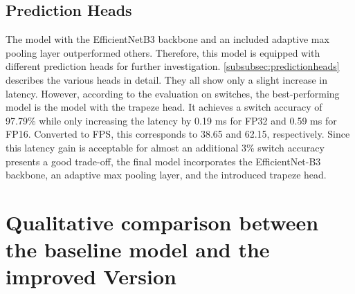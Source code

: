\subsection{Prediction Heads}

\begin{table}[H]
    \centering
    \caption{Prediction Heads Results}
    \label{tab:predHeadsResults}
\end{table}

The model with the EfficientNetB3 backbone and an included adaptive max pooling layer outperformed others.
Therefore, this model is equipped with different prediction heads for further investigation.
\autoref{subsubsec:predictionheads} describes the various heads in detail.
They all show only a slight increase in latency.
However, according to the evaluation on switches, the best-performing model is the model with the trapeze head.
It achieves a switch accuracy of 97.79\% while only increasing the latency by 0.19 ms for FP32 and 0.59 ms for FP16.
Converted to \ac{FPS}, this corresponds to 38.65 and 62.15, respectively.
Since this latency gain is acceptable for almost an additional 3\% switch accuracy presents a good trade-off, the final model incorporates the EfficientNet-B3 backbone, an adaptive max pooling layer, and the introduced trapeze head.

\section{Qualitative comparison between the baseline model and the improved Version}

